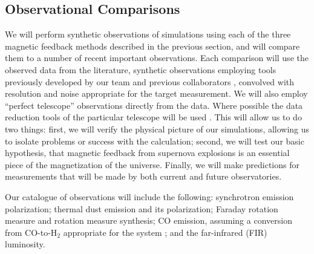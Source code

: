 
\vspace{-3mm}
\subsection{Observational Comparisons}
\label{sec:observational_comps}
\vspace{-2mm}

We will perform synthetic observations of simulations using each of the
three magnetic feedback methods described in the previous section, and
will compare them
to a number of recent important observations.  Each comparison will use the
observed data from the literature, synthetic observations employing tools previously
developed by our team and previous collaborators
\citep[e.g.,][]{2013ApJ...765...21S,Barrow17,Barrow17_FL2}, convolved with
resolution and noise appropriate for the target measurement.  We will also
employ ``perfect telescope'' observations directly from the data.  Where
possible the data reduction tools of the particular telescope will be used \citep[e.g.,
CASA; ][]{McMullin07}.
This will allow us to do two things: first, we will verify the physical picture of
our simulations, allowing us to isolate problems or
success with the calculation; second, we will test our basic hypothesis, that
magnetic feedback from supernova explosions is an essential piece of the
magnetization of the universe.  Finally, we will make
predictions for measurements that will be made by both current and
future observatories.  

Our catalogue of observations will include the following: synchrotron emission
polarization; thermal dust emission and its polarization; Faraday rotation
measure and rotation measure synthesis; CO emission, assuming a conversion from
CO-to-H$_2$ appropriate for the system \citet[e.g.][]{Genzel12,Clark15}; and the
far-infrared (FIR) luminosity.%
